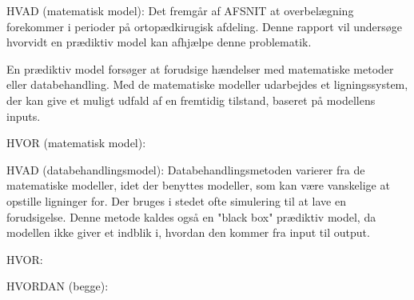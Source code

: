 %
HVAD (matematisk model):
Det fremgår af AFSNIT at overbelægning forekommer i perioder på ortopædkirugisk afdeling. Denne rapport vil undersøge hvorvidt en prædiktiv model kan afhjælpe denne problematik. 

En prædiktiv model forsøger at forudsige hændelser med matematiske metoder eller databehandling. Med de matematiske modeller udarbejdes et ligningssystem, der kan give et muligt udfald af en fremtidig tilstand, baseret på modellens inputs.

HVOR (matematisk model):


HVAD (databehandlingsmodel):
Databehandlingsmetoden varierer fra de matematiske modeller, idet der benyttes modeller, som kan være vanskelige at opstille ligninger for. Der bruges i stedet ofte simulering til at lave en forudsigelse. Denne metode kaldes også en "black box" prædiktiv model, da modellen ikke giver et indblik i, hvordan den kommer fra input til output.

HVOR: 


HVORDAN (begge):




